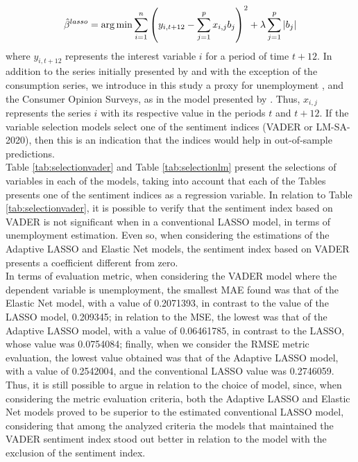 \begin{align}
    \hat{\beta}^{lasso} = \operatorname*{arg\,min} \sum_{i=1}^{n}\left(y_{i,t+12} - \sum_{j=1}^{p}x_{i,j}b_j\right)^2 +\lambda\sum_{j=1}^p |b_j|
\end{align}
where $y_{i,t+12}$ represents the interest variable $i$ for a period of time $t+12$. In addition to the series initially presented by \cite{barsky2012information} and with the exception of the consumption series, we introduce in this study a proxy for unemployment \cite[]{shapiro2020measuring}, and the Consumer Opinion Surveys, as in the model presented by \cite{shapiro2020measuring}. Thus, $x_{i,j}$ represents the series $i$ with its respective value in the periods $t$ and $t+12$. If the variable selection models select one of the sentiment indices (VADER or LM-SA-2020), then this is an indication that the indices would help in out-of-sample predictions.\\

Table \ref{tab:selectionvader} and Table \ref{tab:selectionlm} present the selections of variables in each of the models, taking into account that each of the Tables presents one of the sentiment indices as a regression variable. In relation to Table \ref{tab:selectionvader}, it is possible to verify that the sentiment index based on VADER is not significant when in a conventional LASSO model, in terms of unemployment estimation. Even so, when considering the estimations of the Adaptive LASSO and Elastic Net models, the sentiment index based on VADER presents a coefficient different from zero.\\

In terms of evaluation metric, when considering the VADER model where the dependent variable is unemployment, the smallest MAE found was that of the Elastic Net model, with a value of 0.2071393, in contrast to the value of the LASSO model, 0.209345; in relation to the MSE, the lowest was that of the Adaptive LASSO model, with a value of 0.06461785, in contrast to the LASSO, whose value was 0.0754084; finally, when we consider the RMSE metric evaluation, the lowest value obtained was that of the Adaptive LASSO model, with a value of 0.2542004, and the conventional LASSO value was 0.2746059. Thus, it is still possible to argue in relation to the choice of model, since, when considering the metric evaluation criteria, both the Adaptive LASSO and Elastic Net models proved to be superior to the estimated conventional LASSO model, considering that among the analyzed criteria the models that maintained the VADER sentiment index stood out better in relation to the model with the exclusion of the sentiment index.\\

